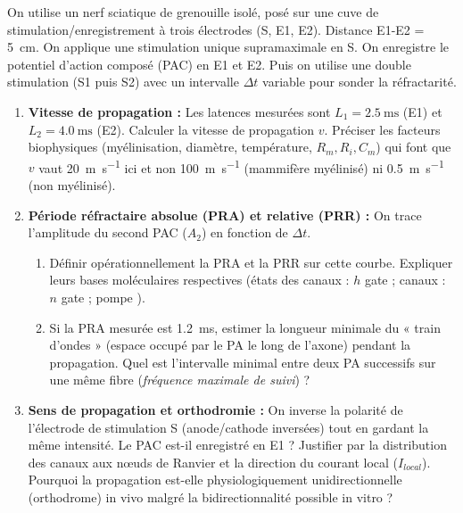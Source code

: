 \documentclass[11pt]{article}
\begin{document}
\begin{exercice}
On utilise un nerf sciatique de grenouille isolé, posé sur une cuve de stimulation/enregistrement à trois électrodes (S, E1, E2). Distance E1-E2 = \SI{5}{\centi\meter}. On applique une stimulation unique supramaximale en S. On enregistre le potentiel d'action composé (PAC) en E1 et E2. Puis on utilise une double stimulation (S1 puis S2) avec un intervalle $\Delta t$ variable pour sonder la réfractarité.

\begin{enumerate}
    \item \textbf{Vitesse de propagation :} Les latences mesurées sont $L_1 = \SI{2.5}{\milli\second}$ (E1) et $L_2 = \SI{4.0}{\milli\second}$ (E2). Calculer la vitesse de propagation $v$. Préciser les facteurs biophysiques (myélinisation, diamètre, température, $R_m, R_i, C_m$) qui font que $v$ vaut \SI{20}{\meter\per\second} ici et non \SI{100}{\meter\per\second} (mammifère myélinisé) ni \SI{0.5}{\meter\per\second} (non myélinisé).
    \item \textbf{Période réfractaire absolue (PRA) et relative (PRR) :} On trace l'amplitude du second PAC ($A_2$) en fonction de $\Delta t$.
    \begin{enumerate}
        \item Définir opérationnellement la PRA et la PRR sur cette courbe. Expliquer leurs bases moléculaires respectives (états des canaux  : $h$ gate ; canaux  : $n$ gate ; pompe ).
        \item Si la PRA mesurée est \SI{1.2}{\milli\second}, estimer la longueur minimale du « train d'ondes » (espace occupé par le PA le long de l'axone) pendant la propagation. Quel est l'intervalle minimal entre deux PA successifs sur une même fibre (\textit{fréquence maximale de suivi}) ?
    \end{enumerate}
    \item \textbf{Sens de propagation et orthodromie :} On inverse la polarité de l'électrode de stimulation S (anode/cathode inversées) tout en gardant la même intensité. Le PAC est-il enregistré en E1 ? Justifier par la distribution des canaux  aux nœuds de Ranvier et la direction du courant local ($I_{local}$). Pourquoi la propagation est-elle physiologiquement unidirectionnelle (orthodrome) in vivo malgré la bidirectionnalité possible in vitro ?
\end{enumerate}
\end{exercice}
\end{document}
